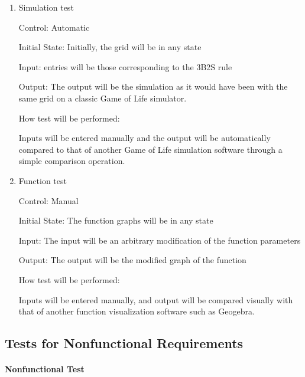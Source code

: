 \documentclass[12pt, titlepage]{article}
\begin{document}
\begin{enumerate}

\item{Simulation test\\}

Control: Automatic
					
Initial State: Initially, the grid will be in any state
					
Input: entries will be those corresponding to the 3B2S rule
					
Output: The output will be the simulation as it would have been with the same grid on a classic Game of Life simulator.

How test will be performed:

Inputs will be entered manually and the output will be automatically compared to that of another Game of Life simulation software through a simple comparison operation.

\item{Function test\\}

Control: Manual
					
Initial State: The function graphs will be in any state

Input: The input will be an arbitrary modification of the function parameters
					
Output: The output will be the modified graph of the function

How test will be performed:

Inputs will be entered manually, and output will be compared visually with that of another function visualization software such as Geogebra.

\end{enumerate}

\subsection{Tests for Nonfunctional Requirements}
		
\paragraph{Nonfunctional Test}
\end{document}
